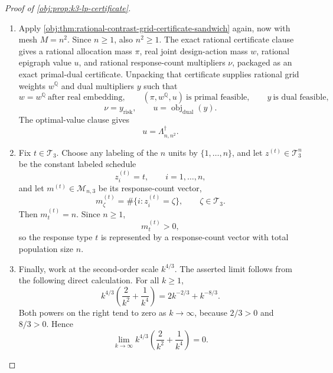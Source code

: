 \documentclass[11pt]{article}
\begin{document}
\begin{proof}[Proof of \cref{obj:prop:k3-lp-certificate}]
\begin{enumerate}
\item Apply \cref{obj:thm:rational-contrast-grid-certificate-sandwich} again, now with mesh \(M=n^2\).  Since \(n\ge1\), also \(n^2\ge1\).  The exact rational certificate clause gives a rational allocation mass \(\pi\), real joint design-action mass \(w\), rational epigraph value \(u\), and rational response-count multipliers \(\nu\), packaged as an exact primal-dual certificate.  Unpacking that certificate supplies rational grid weights \(w^{\mathbb Q}\) and dual multipliers \(y\) such that
\[
w=w^{\mathbb Q}\ \text{after real embedding},\qquad
(\pi,w^{\mathbb Q},u)\ \text{is primal feasible},\qquad
y\ \text{is dual feasible},
\]
\[
\nu=y_{\mathrm{risk}},
\qquad
u=\operatorname{obj}_{\mathrm{dual}}(y).
\]
The optimal-value clause gives
\[
u=\Lambda_{n,n^2}^\dagger .
\]

\item Fix \(t\in\mathcal T_3\).  Choose any labeling of the \(n\) units by \(\{1,\ldots,n\}\), and let \(z^{(t)}\in\mathcal T_3^n\) be the constant labeled schedule
\[
z_i^{(t)}=t,\qquad i=1,\ldots,n,
\]
and let \(m^{(t)}\in\mathcal M_{n,3}\) be its response-count vector,
\[
m^{(t)}_\zeta=\#\{i:z_i^{(t)}=\zeta\},
\qquad \zeta\in\mathcal T_3 .
\]
Then \(m^{(t)}_t=n\).  Since \(n\ge1\),
\[
m^{(t)}_t>0,
\]
so the response type \(t\) is represented by a response-count vector with total population size \(n\).

\item Finally, work at the second-order scale \(k^{4/3}\).  The asserted limit follows from the following direct calculation.  For all \(k\ge1\),
\[
k^{4/3}\left(\frac{2}{k^2}+\frac{1}{k^4}\right)
=
2k^{-2/3}+k^{-8/3}.
\]
Both powers on the right tend to zero as \(k\to\infty\), because \(2/3>0\) and \(8/3>0\).  Hence
\[
\lim_{k\to\infty}
k^{4/3}\left(\frac{2}{k^2}+\frac{1}{k^4}\right)=0 .
\]
\end{enumerate}
\end{proof}
\end{document}
